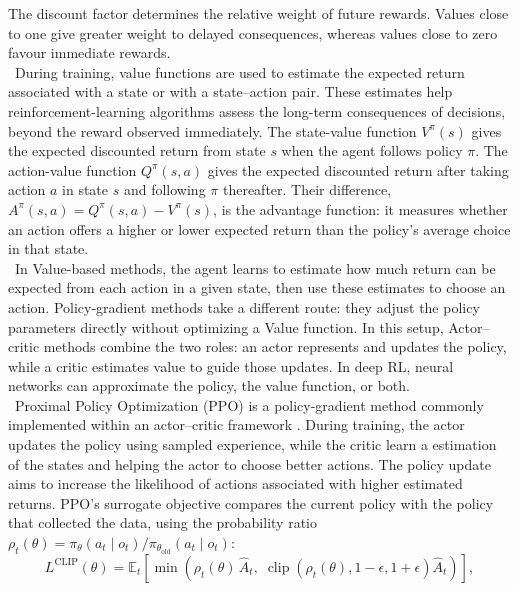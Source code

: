 %
The discount factor determines the relative weight of future rewards. Values
close to one give greater weight to delayed consequences, whereas values close
to zero favour immediate rewards.\\
\
During training, value functions are used to estimate the expected return
associated with a state or with a state--action pair. These estimates help
reinforcement-learning algorithms assess the long-term consequences of
decisions, beyond the reward observed immediately. The state-value function
\(V^\pi(s)\) gives the expected discounted return from state \(s\) when the
agent follows policy \(\pi\). The action-value function \(Q^\pi(s,a)\) gives
the expected discounted return after taking action \(a\) in state \(s\) and
following \(\pi\) thereafter.
Their difference,
\(A^\pi(s,a)=Q^\pi(s,a)-V^\pi(s)\), is the advantage function: it measures whether
an action offers a higher or lower expected return than the policy's average
choice in that state.\\
\
In Value-based methods, the agent learns to estimate how much return can be expected from
each action in a given state, then use these estimates to choose an action.
Policy-gradient methods take a different route: they adjust the policy
parameters directly without optimizing a Value function.
In this setup, Actor--critic methods combine the two roles: an actor represents and updates
the policy, while a critic estimates value to guide those updates. In deep
RL, neural networks can approximate the policy, the value function, or both.\\
\
Proximal Policy Optimization (PPO) is a policy-gradient method commonly
implemented within an actor--critic framework \cite{ppo}. During training, the
actor updates the policy using sampled experience, while the critic learn a estimation of
the states and helping the actor to choose better actions. The policy update aims
to increase the likelihood of actions associated with higher estimated
returns. PPO's surrogate objective compares the current policy with the policy
that collected the data, using the probability ratio
\(\rho_t(\theta)=\pi_\theta(a_t \mid o_t)/
\pi_{\theta_{\mathrm{old}}}(a_t \mid o_t)\):
%
\begin{equation}
    L^{\mathrm{CLIP}}(\theta) =
    \mathbb{E}_t
    \left[
        \min\!\left(
            \rho_t(\theta)\,\hat{A}_t,\;
            \operatorname{clip}\!\left(\rho_t(\theta), 1-\epsilon, 1+\epsilon
            \right)\hat{A}_t
        \right)
    \right],
    \label{eq:ppo_clip}
\end{equation}
